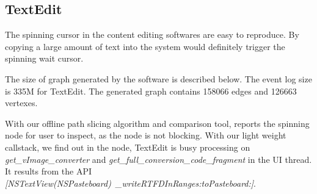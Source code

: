 \subsection{TextEdit}
The spinning cursor in the content editing softwares are easy to reproduce.
By copying a large amount of text into the system would definitely trigger
the spinning wait cursor.

The size of graph generated by the software is described below.
The event log size is 335M for TextEdit.
The generated graph contains 158066 edges and 126663 vertexes.

With our offline path slicing algorithm and comparison tool,
\xxx reports the spinning node for user to inspect, as the node is
not blocking.
With our light weight callstack, we find out in the node,
TextEdit is busy processing on \textit{get\_vImage\_converter}
and \textit{get\_full\_conversion\_code\_fragment} in the UI thread.
It results from the API \textit{[NSTextView(NSPasteboard)\ \_writeRTFDInRanges:toPasteboard:]}.

